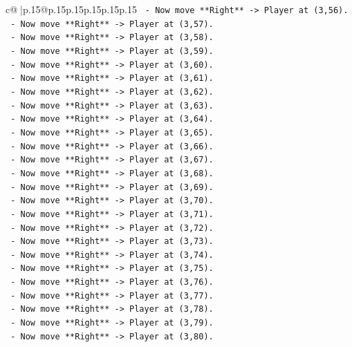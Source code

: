 \documentclass{article}
\begin{document}
{\begin{supertabular}{c@{$\;$}|p{.15\linewidth}@{}p{.15\linewidth}p{.15\linewidth}p{.15\linewidth}p{.15\linewidth}p{.15\linewidth}}
{{{\texttt{    {-}   Now move **Right** {-}> Player at (3,56).} \\
\texttt{    {-}   Now move **Right** {-}> Player at (3,57).} \\
\texttt{    {-}   Now move **Right** {-}> Player at (3,58).} \\
\texttt{    {-}   Now move **Right** {-}> Player at (3,59).} \\
\texttt{    {-}   Now move **Right** {-}> Player at (3,60).} \\
\texttt{    {-}   Now move **Right** {-}> Player at (3,61).} \\
\texttt{    {-}   Now move **Right** {-}> Player at (3,62).} \\
\texttt{    {-}   Now move **Right** {-}> Player at (3,63).} \\
\texttt{    {-}   Now move **Right** {-}> Player at (3,64).} \\
\texttt{    {-}   Now move **Right** {-}> Player at (3,65).} \\
\texttt{    {-}   Now move **Right** {-}> Player at (3,66).} \\
\texttt{    {-}   Now move **Right** {-}> Player at (3,67).} \\
\texttt{    {-}   Now move **Right** {-}> Player at (3,68).} \\
\texttt{    {-}   Now move **Right** {-}> Player at (3,69).} \\
\texttt{    {-}   Now move **Right** {-}> Player at (3,70).} \\
\texttt{    {-}   Now move **Right** {-}> Player at (3,71).} \\
\texttt{    {-}   Now move **Right** {-}> Player at (3,72).} \\
\texttt{    {-}   Now move **Right** {-}> Player at (3,73).} \\
\texttt{    {-}   Now move **Right** {-}> Player at (3,74).} \\
\texttt{    {-}   Now move **Right** {-}> Player at (3,75).} \\
\texttt{    {-}   Now move **Right** {-}> Player at (3,76).} \\
\texttt{    {-}   Now move **Right** {-}> Player at (3,77).} \\
\texttt{    {-}   Now move **Right** {-}> Player at (3,78).} \\
\texttt{    {-}   Now move **Right** {-}> Player at (3,79).} \\
\texttt{    {-}   Now move **Right** {-}> Player at (3,80).} \\
}}}
\end{supertabular}}
\end{document}
